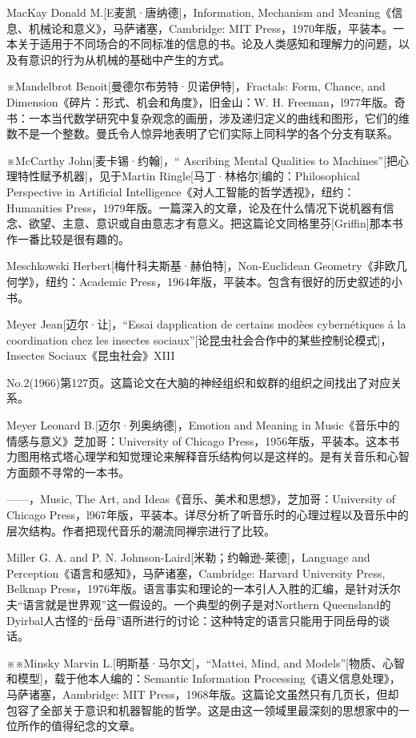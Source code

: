 \documentclass[
  12pt,
  twoside,
  openright,
  oldfontcommands,
]{memoir}
\begin{document}
MacKay Donald M.{[}E麦凯·唐纳德{]}，Information, Mechanism and Meaning《信息、机械论和意义》，马萨诸塞，Cambridge: MIT Press，1970年版，平装本。一本关于适用于不同场合的不同标准的信息的书。论及人类感知和理解力的问题，以及有意识的行为从机械的基础中产生的方式。

※Mandelbrot Benoit{[}曼德尔布劳特·贝诺伊特{]}，Fractals: Form, Chance, and Dimension《碎片：形式、机会和角度》，旧金山：W. H. Freeman，l977年版。奇书：一本当代数学研究中复杂观念的画册，涉及递归定义的曲线和图形，它们的维数不是一个整数。曼氏令人惊异地表明了它们实际上同科学的各个分支有联系。

※McCarthy John{[}麦卡锡·约翰{]}，`` Ascribing Mental Qualities to Machines''{[}把心理特性赋予机器{]}，见于Martin Ringle{[}马丁·林格尔{]}编的：Philosophical Perspective in Artificial Intelligence《对人工智能的哲学透视》，纽约：Humanities Press，1979年版。一篇深入的文章，论及在什么情况下说机器有信念、欲望、主意、意识或自由意志才有意义。把这篇论文同格里芬{[}Griffin{]}那本书作一番比较是很有趣的。

Meschkowski Herbert{[}梅什科夫斯基·赫伯特{]}，Non-Euclidean Geometry《非欧几何学》，纽约：Academic Press，1964年版，平装本。包含有很好的历史叙述的小书。

Meyer Jean{[}迈尔·让{]}，``Essai d\textquotesingle application de certains modèes cybernétiques á la coordination chez les insectes sociaux''{[}论昆虫社会合作中的某些控制论模式{]}，Insectes Sociaux《昆虫社会》XIII

No.2(1966)第127页。这篇论文在大脑的神经组织和蚁群的组织之间找出了对应关系。

Meyer Leonard B.{[}迈尔·列奥纳德{]}，Emotion and Meaning in Music《音乐中的情感与意义》芝加哥：University of Chicago Press，1956年版，平装本。这本书力图用格式塔心理学和知觉理论来解释音乐结构何以是这样的。是有关音乐和心智方面颇不寻常的一本书。

------，Music, The Art, and Ideas《音乐、美术和思想》，芝加哥：University of Chicago Press，l967年版，平装本。详尽分析了听音乐时的心理过程以及音乐中的层次结构。作者把现代音乐的潮流同禅宗进行了比较。

Miller G. A. and P. N. Johnson-Laird{[}米勒；约翰逊-莱德{]}，Language and Perception《语言和感知》，马萨诸塞，Cambridge: Harvard University Press, Belknap Press，1976年版。语言事实和理论的一本引人入胜的汇编，是针对沃尔夫``语言就是世界观''这一假设的。一个典型的例子是对Northern Queensland的Dyirbal人古怪的``岳母''语所进行的讨论：这种特定的语言只能用于同岳母的谈话。

※※Minsky Marvin L.{[}明斯基·马尔文{]}，``Mattei, Mind, and Models''{[}物质、心智和模型{]}，载于他本人编的：Semantic Information Processing《语义信息处理》，马萨诸塞，Aambridge: MIT Press，1968年版。这篇论文虽然只有几页长，但却包容了全部关于意识和机器智能的哲学。这是由这一领域里最深刻的思想家中的一位所作的值得纪念的文章。
\end{document}
